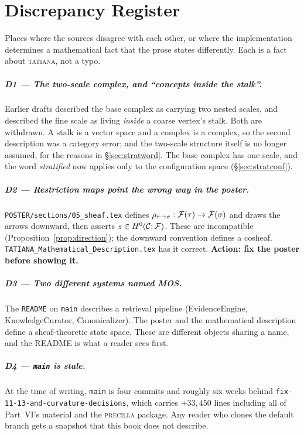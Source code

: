 \chapter{Discrepancy Register}\label{app:discrepancy}

Places where the sources disagree with each other, or where the
implementation determines a mathematical fact that the prose states
differently. Each is a fact about \textsc{tatiana}, not a typo.

\paragraph{D1 --- The two-scale complex, and ``concepts inside the stalk''.}
Earlier drafts described the base complex as carrying two nested scales, and
described the fine scale as living \emph{inside} a coarse vertex's stalk.
Both are withdrawn. A stalk is a vector space and a complex is a complex, so
the second description was a category error; and the two-scale structure
itself is no longer assumed, for the reasons in \S\ref{sec:stratword}.
The base complex has one scale, and the word \emph{stratified} now applies
only to the configuration space (\S\ref{sec:stratconf}).

\paragraph{D2 --- Restriction maps point the wrong way in the poster.}
\texttt{POSTER/sections/05\_sheaf.tex} defines
$\rho_{\tau\to\sigma}:\mathcal{F}(\tau)\to\mathcal{F}(\sigma)$ and draws the
arrows downward, then asserts $s\in H^{0}(\mathcal{C};\mathcal{F})$. These are incompatible
(Proposition~\ref{prop:direction}); the downward convention defines a
cosheaf. \texttt{TATIANA\_Mathematical\_Description.tex} has it correct.
\textbf{Action: fix the poster before showing it.}

\paragraph{D3 --- Two different systems named MOS.}
The \texttt{README} on \texttt{main} describes a retrieval pipeline
(EvidenceEngine, KnowledgeCurator, Canonicalizer). The poster and the
mathematical description define a sheaf-theoretic state space. These are
different objects sharing a name, and the README is what a reader sees
first.

\paragraph{D4 --- \texttt{main} is stale.}
At the time of writing, \texttt{main} is four commits and roughly six
weeks behind \texttt{fix-11-13-and-curvature-decisions}, which carries
$+33{,}450$ lines including all of Part~VI's material and the
\textsc{precilla} package. Any reader who clones the default branch gets
a snapshot that this book does not describe.

